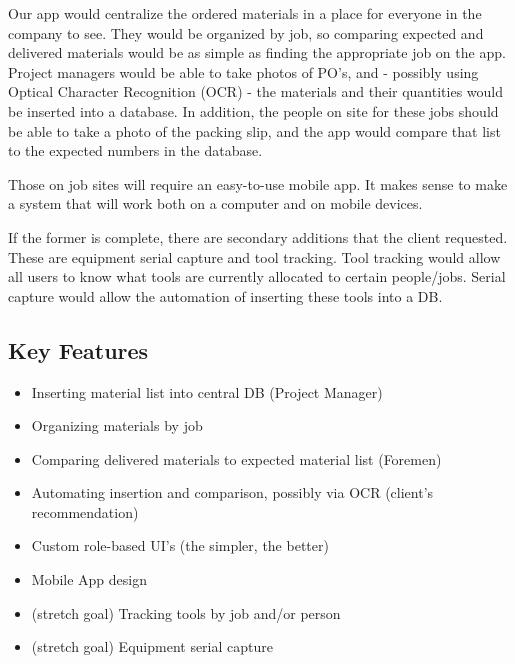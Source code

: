 \documentclass{article}
\begin{document}
Our app would centralize the ordered materials in a place for everyone in the company to see. They would be organized by job, so comparing expected and delivered materials would be as simple as finding the appropriate job on the app. Project managers would be able to take photos of PO's, and - possibly using Optical Character Recognition (OCR) - the materials and their quantities would be inserted into a database. In addition, the people on site for these jobs should be able to take a photo of the packing slip, and the app would compare that list to the expected numbers in the database. 

Those on job sites will require an easy-to-use mobile app. It makes sense to make a system that will work both on a computer and on mobile devices. 

If the former is complete, there are secondary additions that the client requested. These are equipment serial capture and tool tracking. Tool tracking would allow all users to know what tools are currently allocated to certain people/jobs. Serial capture would allow the automation of inserting these tools into a DB. 

\subsection{Key Features}
\begin{itemize}
    \item Inserting material list into central DB (Project Manager)
    \item Organizing materials by job
    \item Comparing delivered materials to expected material list (Foremen)
    \item Automating insertion and comparison, possibly via OCR (client's recommendation)
    \item Custom role-based UI's (the simpler, the better)
    \item Mobile App design
    \item (stretch goal) Tracking tools by job and/or person 
    \item (stretch goal) Equipment serial capture
\end{itemize}
\end{document}
